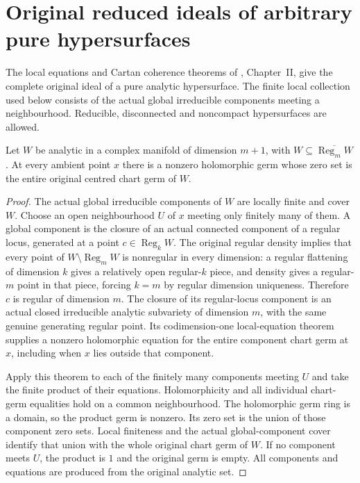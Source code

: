 \section{Original reduced ideals of arbitrary pure hypersurfaces}
\label{sec:hironaka-pure-codimension-one-ideal}

The local equations and Cartan coherence theorems of
\cite{demailly-cadg}, Chapter~II, give the complete original ideal of a
pure analytic hypersurface. The finite local collection used below consists
of the actual global irreducible components meeting a neighbourhood.
Reducible, disconnected and noncompact hypersurfaces are allowed.

\begin{lemma}
\label{hir:pure-hypersurface-original-equation}
\leanok
Let $W$ be analytic in a complex manifold of dimension $m+1$, with
$W\subseteq\overline{\operatorname{Reg}_m W}$. At every ambient point $x$
there is a nonzero holomorphic germ whose zero set is the entire original
centred chart germ of $W$.
\end{lemma}
\begin{proof}
The actual global irreducible components of $W$ are locally finite and cover
$W$. Choose an open neighbourhood $U$ of $x$ meeting only finitely many of
them. A global component is the closure of an actual connected component
of a regular locus, generated at a point $c\in\operatorname{Reg}_k W$.
The original regular density implies that every point of
$W\setminus\operatorname{Reg}_m W$ is nonregular in every dimension:
a regular flattening of dimension $k$ gives a relatively open regular-$k$
piece, and density gives a regular-$m$ point in that piece, forcing $k=m$
by regular dimension uniqueness. Therefore $c$ is regular of dimension
$m$. The closure of its regular-locus component is an actual closed
irreducible analytic subvariety of dimension $m$, with the same genuine
generating regular point. Its codimension-one local-equation theorem
supplies a nonzero holomorphic equation for the entire component chart
germ at $x$, including when $x$ lies outside that component.

Apply this theorem to each of the finitely many components meeting $U$
and take the finite product of their equations. Holomorphicity and all
individual chart-germ equalities hold on a common neighbourhood. The
holomorphic germ ring is a domain, so the product germ is nonzero.
Its zero set is the union of those component zero sets. Local finiteness
and the actual global-component cover identify that union with the whole
original chart germ of $W$. If no component meets $U$, the product is $1$
and the original germ is empty. All components and equations are produced
from the original analytic set.
\end{proof}

